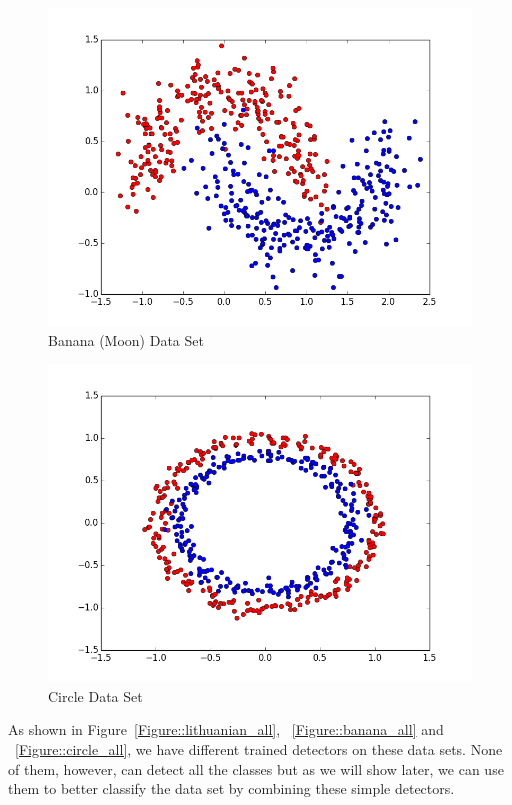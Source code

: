 \begin{figure}[]
\centering
\includegraphics[scale=0.6]{figs/dataset_Banana}
\caption{Banana (Moon) Data Set}
\label{Figure::banana}
\end{figure}

\begin{figure}[]
\centering
\includegraphics[scale=0.6]{figs/dataset_circle}
\caption{Circle Data Set}
\label{Figure::circle}
\end{figure}

As shown in Figure~\ref{Figure::lithuanian_all}, ~\ref{Figure::banana_all} and ~\ref{Figure::circle_all}, we have different trained detectors on these data sets. None of them, however, can detect all the classes but as we will show later, we can use them to better classify the data set by combining these simple detectors.

